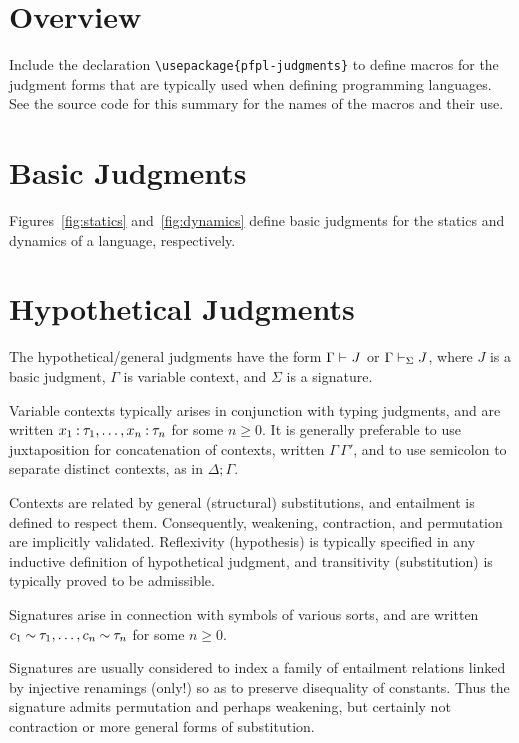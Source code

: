 \documentclass[11pt]{article}
\begin{document}
\section*{Overview}

Include the declaration \verb|\usepackage{pfpl-judgments}| to define macros for the judgment forms that are typically used when defining programming languages.  See the source code for this summary for the names of the macros and their use.

\section*{Basic Judgments}

Figures~\ref{fig:statics} and~\ref{fig:dynamics} define basic judgments for the statics and dynamics of a language, respectively.

\section*{Hypothetical Judgments}

The hypothetical/general judgments have the form $\Gamma\entails J$ or $\Gamma\entails[\Sigma] J$, where $J$ is a basic judgment, $\Gamma$ is variable context, and $\Sigma$ is a signature.

Variable contexts typically arises in conjunction with typing judgments, and are written $\isOf*{x_1}{\tau_1},\dots,\isOf*{x_n}{\tau_n}$ for some $n\geq 0$.
It is generally preferable to use juxtaposition for concatenation of contexts, written $\Gamma\,\Gamma'$, and to use semicolon to separate distinct contexts, as in $\Delta;\Gamma$.

Contexts are related by general (structural) substitutions, and entailment is defined to respect them.  Consequently, weakening, contraction, and permutation are implicitly validated.  Reflexivity (hypothesis) is typically specified in any inductive definition of hypothetical judgment, and transitivity (substitution) is typically proved to be admissible.

Signatures arise in connection with symbols of various sorts, and are written $\hasTp*{c_1}{\tau_1},\dots,\hasTp*{c_n}{\tau_n}$ for some $n\geq 0$.

Signatures are usually considered to index a family of entailment relations linked by injective renamings (only!) so as to preserve disequality of constants.  Thus the signature admits permutation and perhaps weakening, but certainly not contraction or more general forms of substitution.
\end{document}
